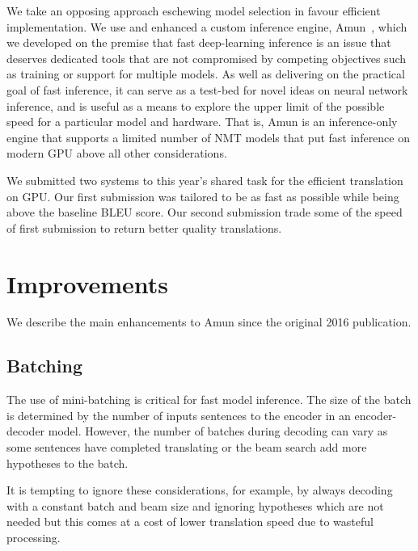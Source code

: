 \documentclass[11pt,a4paper]{article}
\begin{document}
We take an opposing approach eschewing model selection in favour efficient implementation. We use and enhanced a custom inference engine, Amun~\citep{junczys2016neural}, which we developed on the premise that fast deep-learning inference is an issue that deserves dedicated tools that are not compromised by competing objectives such as training or support for multiple models. As well as delivering on the practical goal of fast inference, it can serve as a test-bed for novel ideas on neural network inference, and is useful as a means to explore the upper limit of the possible speed for a particular model and hardware. That is, Amun is an inference-only engine that supports a limited number of NMT models that put fast inference on modern GPU above all other considerations. %

We submitted two systems to this year's shared task for the efficient translation on GPU. Our first submission was tailored to be as fast as possible while being above the baseline BLEU score. Our second submission trade some of the speed of first submission to return better quality translations.



\section{Improvements}

We describe the main enhancements to Amun since the original 2016 publication.

\subsection{Batching}

The use of mini-batching is critical for fast model inference. The size of the batch is determined by the number of inputs sentences to the encoder in an encoder-decoder model. However, the number of batches during decoding can vary as some sentences have completed translating or the beam search add more hypotheses to the batch.

It is tempting to ignore these considerations, for example, by always decoding with a constant batch and beam size and ignoring hypotheses which are not needed but this comes at a cost of lower translation speed due to wasteful processing.
\end{document}
